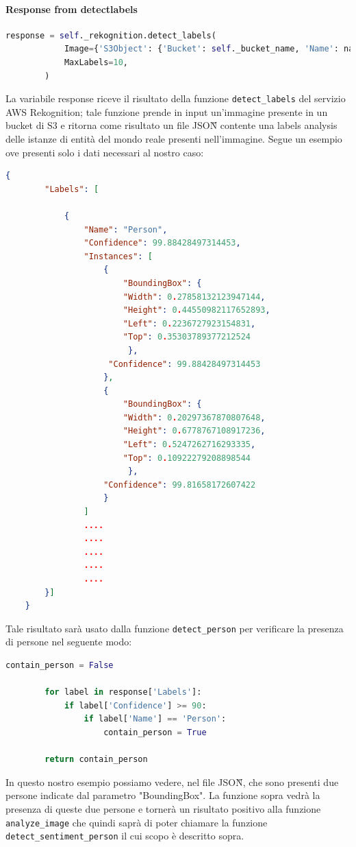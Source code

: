 \paragraph{Response from detect\textunderscore{}labels} \aCapo{}
	\begin{lstlisting}[language=Python]
response = self._rekognition.detect_labels(
            Image={'S3Object': {'Bucket': self._bucket_name, 'Name': name_image}},
            MaxLabels=10,
        )
	\end{lstlisting}
La variabile response riceve il risultato della funzione \verb+detect_labels+ del servizio AWS Rekognition; tale funzione prende in input un'immagine presente in un bucket di S3 e ritorna come risultato un file JSON\G{} contente una labels analysis delle istanze di entità del mondo reale presenti nell'immagine. Segue un esempio ove presenti solo i dati necessari al nostro caso:
\begin{lstlisting}[language=JSON]
	{
		"Labels": [

			{
				"Name": "Person",
                "Confidence": 99.88428497314453,
                "Instances": [
                	{
                    	"BoundingBox": {
                        "Width": 0.27858132123947144,
                        "Height": 0.44550982117652893,
                        "Left": 0.2236727923154831,
                        "Top": 0.35303789377212524
                         },
                     "Confidence": 99.88428497314453
                    },
					{
                        "BoundingBox": {
                        "Width": 0.20297367870807648,
                        "Height": 0.6778767108917236,
                        "Left": 0.5247262716293335,
                        "Top": 0.10922279208898544
                      	 },
                    "Confidence": 99.81658172607422
					}
				]
                ....
                ....
                ....
                ....
            	....
		}]
	}
	\end{lstlisting}
Tale risultato sarà usato dalla funzione \verb+detect_person+ per verificare la presenza di persone nel seguente modo:
\begin{lstlisting}[language=Python]
		contain_person = False

        for label in response['Labels']:
            if label['Confidence'] >= 90:
                if label['Name'] == 'Person':
                    contain_person = True

        return contain_person
\end{lstlisting}
In questo nostro esempio possiamo vedere, nel file JSON\G{}, che sono presenti due persone indicate dal parametro "BoundingBox". La funzione sopra vedrà la presenza di queste due persone e tornerà un risultato positivo alla funzione \verb+analyze_image+ che quindi saprà di poter chiamare la funzione \verb+detect_sentiment_person+ il cui scopo è descritto sopra.

